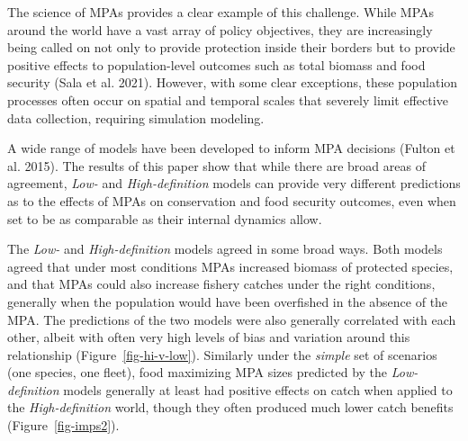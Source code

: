 \documentclass[
  default,
  lineno,
  referee]{sn-jnl}
\begin{document}
The science of MPAs provides a clear example of this challenge. While
MPAs around the world have a vast array of policy objectives, they are
increasingly being called on not only to provide protection inside their
borders but to provide positive effects to population-level outcomes
such as total biomass and food security (Sala et al. 2021). However,
with some clear exceptions, these population processes often occur on
spatial and temporal scales that severely limit effective data
collection, requiring simulation modeling.

A wide range of models have been developed to inform MPA decisions
(Fulton et al. 2015). The results of this paper show that while there
are broad areas of agreement, \emph{Low-} and \emph{High-definition}
models can provide very different predictions as to the effects of MPAs
on conservation and food security outcomes, even when set to be as
comparable as their internal dynamics allow.

The \emph{Low-} and \emph{High-definition} models agreed in some broad
ways. Both models agreed that under most conditions MPAs increased
biomass of protected species, and that MPAs could also increase fishery
catches under the right conditions, generally when the population would
have been overfished in the absence of the MPA. The predictions of the
two models were also generally correlated with each other, albeit with
often very high levels of bias and variation around this relationship
(Figure~\ref{fig-hi-v-low}). Similarly under the \emph{simple} set of
scenarios (one species, one fleet), food maximizing MPA sizes predicted
by the \emph{Low-definition} models generally at least had positive
effects on catch when applied to the \emph{High-definition} world,
though they often produced much lower catch benefits
(Figure~\ref{fig-imps2}).
\end{document}
